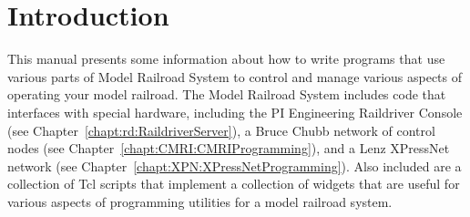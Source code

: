 
\chapter{Introduction}
\label{chapt:Introduction}

This manual presents some information about how to write programs that
use various parts of Model Railroad System to control and manage various
aspects of operating your model railroad.  The Model Railroad System
includes code that interfaces with special hardware, including the PI
Engineering Raildriver Console (see
Chapter~\ref{chapt:rd:RaildriverServer}), a Bruce Chubb network of control
nodes (see  Chapter~\ref{chapt:CMRI:CMRIProgramming}), and a Lenz XPressNet
network (see Chapter~\ref{chapt:XPN:XPressNetProgramming}).  Also included
are a collection of Tcl scripts that implement a collection of widgets
that are useful for various aspects of programming utilities for a model
railroad system.
